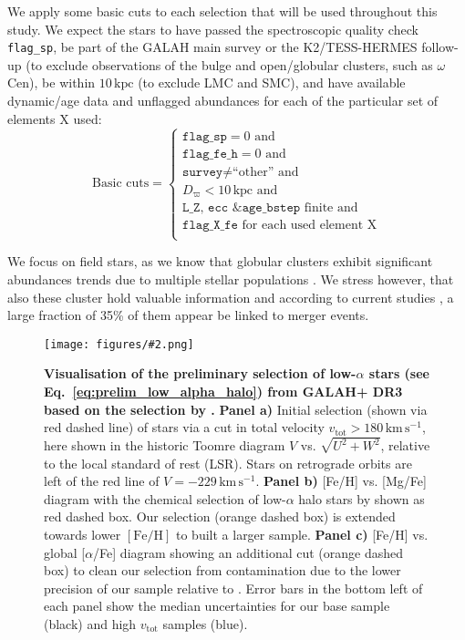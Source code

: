 \documentclass[fleqn,usenatbib]{mnras}
\newcommand{\kpc}{\,\mathrm{kpc}}	%
\newcommand{\kms}{\,\mathrm{km\,s^{-1}}}	%
\newcommand{\codeicon}{{\faCloudDownload}}
\newcommand{\codelink}[1]{\href{https://github.com/svenbuder/buder_galah_accreted_chemistry/tree/main/figures/#1.ipynb}{\codeicon}\,\,}
\newcommand{\oscaption}[2]{\caption{#2 \codelink{#1}}}
\newcommand{\figuretextwidth}[4]{\begin{figure*} \centering \texttt{[image: figures/\#2.png]}\oscaption{#3}{#4}\label{fig:#2} \end{figure*}}
\begin{document}
We apply some basic cuts to each selection that will be used throughout this study. We expect the stars to have passed the spectroscopic quality check \texttt{flag\_sp}, be part of the GALAH main survey or the K2/TESS-HERMES follow-up (to exclude observations of the bulge and open/globular clusters, such as $\omega$Cen), be within $10 \kpc$ (to exclude LMC and SMC), and have available dynamic/age data and unflagged abundances for each of the particular set of elements X used:\begin{equation} \label{eq:basic_cuts}
\text{Basic cuts} = 
\begin{cases}
\texttt{flag\_sp} = 0 \text{ and} \\
\texttt{flag\_fe\_h} = 0 \text{ and} \\
\texttt{survey} \neq \text{``other'' and} \\
D_\varpi < 10\kpc \text{ and} \\
\texttt{L\_Z}\text{, }\texttt{ecc}\text{ \& }\texttt{age\_bstep} \text{ finite and} \\
\texttt{flag\_X\_fe} \text{ for each used element X} \\
\end{cases}
\end{equation}

We focus on field stars, as we know that globular clusters exhibit significant abundances trends due to multiple stellar populations \citep[e.g.][]{Carretta2009}. We stress however, that also these cluster hold valuable information and according to current studies \citep[e.g.][]{Massari2019, KochHansen2021}, a large fraction of 35\% of them appear be linked to merger events.

\figuretextwidth{17cm}{nissen_selection_corner}{chemical_differences}{
\textbf{Visualisation of the preliminary selection of low-$\alpha$ stars (see Eq.~\ref{eq:prelim_low_alpha_halo}) from GALAH+ DR3 based on the selection by \citet{Nissen2010}.}
\textbf{Panel a)} Initial selection (shown via red dashed line) of stars via a cut in total velocity $v_\text{tot} > 180\,\mathrm{km\,s^{-1}}$, here shown in the historic Toomre diagram $V$ vs. $\sqrt{U^2 + W^2}$, relative to the local standard of rest (LSR). Stars on retrograde orbits are left of the red line of $V = -229\kms$.
\textbf{Panel b)} [Fe/H] vs. [Mg/Fe] diagram with the chemical selection of low-$\alpha$ halo stars by \citet{Nissen2010} shown as red dashed box. Our selection (orange dashed box) is extended towards lower $\mathrm{[Fe/H]}$ to built a larger sample.
\textbf{Panel c)} [Fe/H] vs. global [$\alpha$/Fe]  diagram showing an additional cut (orange dashed box) to clean our selection from contamination due to the lower precision of our sample relative to \citet{Nissen2010}.
Error bars in the bottom left of each panel show the median uncertainties for our base sample (black) and high $v_\text{tot}$ samples (blue).
}
\end{document}
